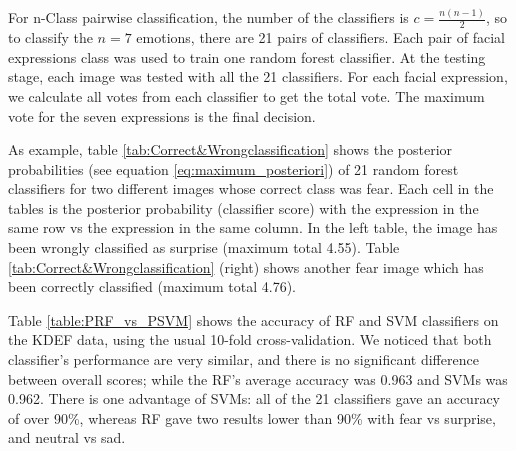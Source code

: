 For n-Class pairwise classification, the number of the classifiers is $c=\frac{n(n-1)}{2}$, so to classify the $n=7$ emotions, there are 21 pairs of classifiers.  Each pair of facial expressions class was used to train one random forest classifier. At the testing stage, each image was tested with all the 21 classifiers. For each facial expression, we calculate all votes from each classifier to get the total vote. The maximum vote for the seven expressions is the final decision.  

As example, table \ref{tab:Correct&Wrongclassification} shows the posterior probabilities (see equation \ref{eq:maximum_posteriori}) of 21 random forest classifiers for two different images whose correct class was fear. Each cell in the tables is the posterior probability (classifier score) with the expression in the same row vs the expression in the same column. In the left table, the image has been wrongly classified as surprise (maximum total 4.55). Table \ref{tab:Correct&Wrongclassification} (right) shows another fear image which has been correctly classified (maximum total 4.76).



Table \ref{table:PRF_vs_PSVM} shows the accuracy of RF and SVM classifiers on the KDEF data, using the usual 10-fold cross-validation. We noticed that both classifier's performance are very similar, and there is no significant difference between overall scores; while the RF's average accuracy was 0.963 and SVMs was 0.962. There is one advantage of SVMs:  all of the 21 classifiers gave an accuracy of over 90\%, whereas RF gave two results lower than 90\% with fear vs surprise, and neutral vs sad. 


